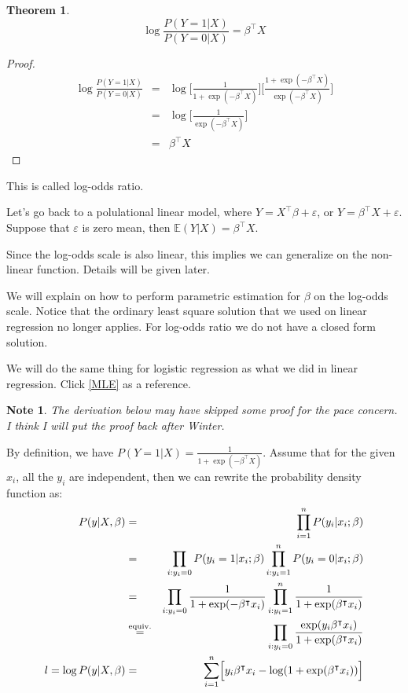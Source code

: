 \documentclass{article}
\theoremstyle{MyNonumberplain}
\theoremstyle{break}
\newtheorem*{proof}{Proof. }
\newcommand{\ve}{\varepsilon}
\newcommand{\ev}{\mathbb{E}}
\newcommand{\T}{^\intercal}
\theoremstyle{break}
\newtheorem{theorem}{Theorem}[section]
\newtheorem{note}{Note}
\begin{document}
\begin{thmbox}
    \begin{theorem}
        $$\log{\frac{P(Y=1|X)}{P(Y=0|X)}}=\beta\T X$$
    \end{theorem}
    \begin{prfbox}
        \begin{proof}
            \begin{eqnarray*}
                \log{\frac{P(Y=1|X)}{P(Y=0|X)}} &=& \log{\Biggl[\frac{1}{1+\exp(-\beta\T X)}\Biggr]\Biggl[\frac{1+\exp(-\beta\T X)}{\exp(-\beta\T X)}\Biggr]}\\
                                                &=& \log{\Biggl[\frac{1}{\exp(-\beta\T X)}\Biggr]}\\
                                                &=& \beta\T X
            \end{eqnarray*}
        \end{proof}
    \end{prfbox}
    This is called log-odds ratio.
\end{thmbox}

Let's go back to a polulational linear model, where $Y=X\T\beta+\ve$, or $Y=\beta\T X+\ve$. Suppose that $\ve$ is zero mean, then $\ev(Y\vert X)=\beta\T X$.

Since the log-odds scale is also linear, this implies we can generalize on the non-linear function. Details will be given later.

We will explain on how to perform parametric estimation for $\beta$ on the log-odds scale. 
Notice that the ordinary least square solution that we used on linear regression no longer applies.
For log-odds ratio we do not have a closed form solution. 

We will do the same thing for logistic regression as what we did in linear regression. Click \ref{MLE} as a reference.

\begin{notebox}
    \begin{note}
        The derivation below may have skipped some proof for the pace concern. I think I will put the proof back after Winter.
    \end{note}
\end{notebox}

By definition, we have $P(Y=1|X)=\frac{1}{1+\exp(-\beta\T X)}.$ Assume that for the given $x_i$, all the $y_i$ are independent, then we can rewrite the probability
density function as:
\begin{eqnarray*}
    P(y\vert X,\beta) &=& \prod_{i=1}^n P(y_i\vert x_i;\beta)\\
                      &=& \prod_{i:y_i=0}P(y_i=1\vert x_i;\beta) \prod_{i:y_i=1}^nP(y_i=0\vert x_i;\beta)\\
                      &=& \prod_{i:y_i=0}\frac{1}{1+\exp(-\beta\T x_i)} \prod_{i:y_i=1}^n\frac{1}{1+\exp(\beta\T x_i)}\\
                      &\overset{\text{equiv.}}{=}& \prod_{i:y_i=0}\frac{\exp(y_i\beta\T x_i)}{1+\exp(\beta\T x_i)}\\
    l=\log P(y\vert X,\beta) &=& \sum_{i=1}^n \Bigl[y_i\beta\T x_i-\log(1+\exp(\beta\T x_i))\Bigr]
\end{eqnarray*}
\end{document}
